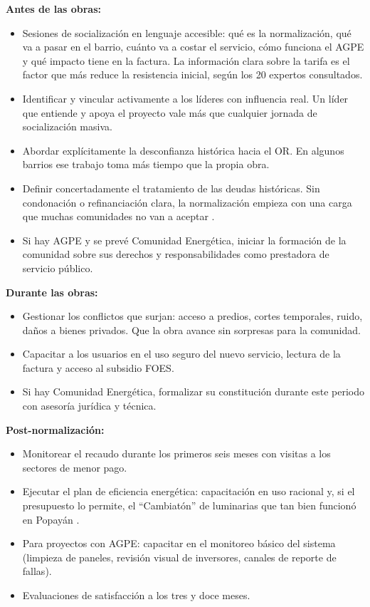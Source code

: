 \textbf{Antes de las obras:}
\begin{itemize}
    \item Sesiones de socialización en lenguaje accesible: qué es la
    normalización, qué va a pasar en el barrio, cuánto va a costar el
    servicio, cómo funciona el AGPE y qué impacto tiene en la factura.
    La información clara sobre la tarifa es el factor que más reduce la
    resistencia inicial, según los 20 expertos consultados.
    \item Identificar y vincular activamente a los líderes con
    influencia real. Un líder que entiende y apoya el proyecto vale
    más que cualquier jornada de socialización masiva.
    \item Abordar explícitamente la desconfianza histórica hacia el OR.
    En algunos barrios ese trabajo toma más tiempo que la propia obra.
    \item Definir concertadamente el tratamiento de las deudas históricas.
    Sin condonación o refinanciación clara, la normalización empieza con
    una carga que muchas comunidades no van a aceptar
    \parencite{SerranoRueda2019}.
    \item Si hay AGPE y se prevé Comunidad Energética, iniciar la
    formación de la comunidad sobre sus derechos y responsabilidades
    como prestadora de servicio público.
\end{itemize}

\textbf{Durante las obras:}
\begin{itemize}
    \item Gestionar los conflictos que surjan: acceso a predios, cortes
    temporales, ruido, daños a bienes privados. Que la obra avance sin
    sorpresas para la comunidad.
    \item Capacitar a los usuarios en el uso seguro del nuevo servicio,
    lectura de la factura y acceso al subsidio FOES.
    \item Si hay Comunidad Energética, formalizar su constitución durante
    este periodo con asesoría jurídica y técnica.
\end{itemize}

\textbf{Post-normalización:}
\begin{itemize}
    \item Monitorear el recaudo durante los primeros seis meses con
    visitas a los sectores de menor pago.
    \item Ejecutar el plan de eficiencia energética: capacitación en
    uso racional y, si el presupuesto lo permite, el ``Cambiatón'' de
    luminarias que tan bien funcionó en Popayán
    \parencite{SerranoRueda2019}.
    \item Para proyectos con AGPE: capacitar en el monitoreo básico del
    sistema (limpieza de paneles, revisión visual de inversores, canales
    de reporte de fallas).
    \item Evaluaciones de satisfacción a los tres y doce meses.
\end{itemize}

